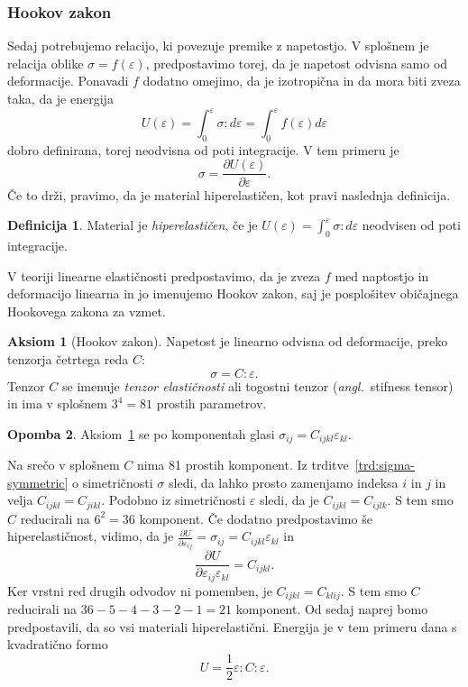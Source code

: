 \documentclass[12pt,a4paper]{article}
\theoremstyle{definition} %
\newtheorem{definicija}{Definicija}[section]
\newtheorem{opomba}[definicija]{Opomba}
\newtheorem{aksiom}{Aksiom}
\theoremstyle{plain} %
\numberwithin{equation}{section}
\newcommand{\eps}{\varepsilon}
\newcommand{\dpar}[2]{\ensuremath{\frac{\partial #1}{\partial #2}}}
\newcommand{\ts}{\sigma}
\newcommand{\ang}[1]{(\textit{angl.}\ #1)}
\begin{document}
\subsubsection{Hookov zakon}
Sedaj potrebujemo relacijo, ki povezuje premike z napetostjo.
V splošnem je relacija oblike $\ts = f(\eps)$, predpostavimo torej, da je
napetost odvisna samo od deformacije. Ponavadi $f$ dodatno omejimo, da je
izotropična in da mora biti zveza taka, da je energija
\[
  U(\eps) = \int_{0}^{\eps} \ts : d\eps = \int_0^\eps f(\eps) d\eps
\]
dobro definirana, torej neodvisna od poti integracije. V tem primeru je
\[
  \ts = \dpar{U(\eps)}{\eps}.
\]
Če to drži, pravimo, da je material hiperelastičen, kot pravi naslednja
definicija.
\begin{definicija}
  Material je \emph{hiperelastičen}, če je $U(\eps) = \int_0^\eps \ts:d\eps$ neodvisen
  od poti integracije.
\end{definicija}
V teoriji linearne elastičnosti
predpostavimo, da je zveza $f$ med naptostjo in deformacijo linearna in jo
imenujemo Hookov zakon, saj je posplošitev običajnega Hookovega zakona za vzmet.
\begin{aksiom}[Hookov zakon]
  \label{aks:hook}
  Napetost je linearno odvisna od deformacije, preko tenzorja četrtega reda $C$:
  \[ \ts = C:\eps. \]
  Tenzor $C$ se imenuje \emph{tenzor elastičnosti} ali togostni tenzor
  \ang{stifness tensor} in ima v splošnem $3^4 = 81$ prostih parametrov.
\end{aksiom}
\begin{opomba}
  Aksiom~\ref{aks:hook} se po komponentah glasi $\ts_{ij} = C_{ijkl}
  \eps_{kl}$.
\end{opomba}
Na srečo v splošnem $C$ nima 81 prostih komponent.
Iz trditve~\ref{trd:sigma-symmetric} o simetričnosti $\ts$ sledi, da lahko
prosto zamenjamo indeksa $i$ in $j$ in velja $C_{ijkl} = C_{jikl}$.
Podobno iz simetričnosti $\eps$ sledi, da je $C_{ijkl} = C_{ijlk}$.
S tem smo $C$ reducirali na $6^2 = 36$ komponent.
Če dodatno predpostavimo še hiperelastičnost, vidimo, da je $\dpar{U}{\eps_{ij}}
= \sigma_{ij} = C_{ijkl}\eps_{kl}$ in
\[
  \dpar{U}{\eps_{ij}\eps_{kl}} = C_{ijkl}.
\]
Ker vrstni red drugih odvodov ni pomemben, je $C_{ijkl} = C_{klij}$.
S tem smo $C$ reducirali na $36-5-4-3-2-1 = 21$ komponent.
Od sedaj naprej bomo predpostavili, da so vsi materiali hiperelastični.
Energija je v tem primeru dana s kvadratično formo
\begin{equation}
  U = \frac12 \eps:C:\eps.
  \label{eq:energy}
\end{equation}
\end{document}
